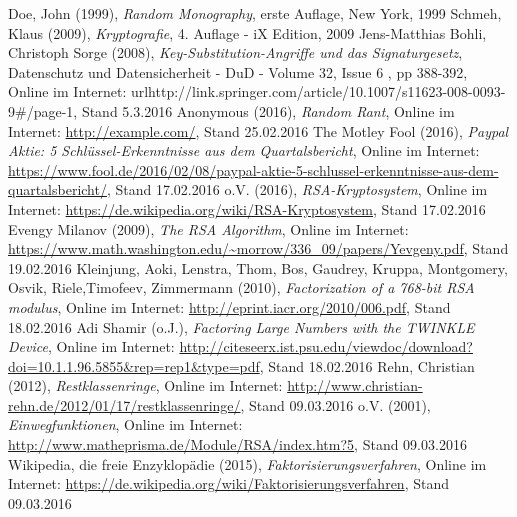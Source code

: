 \documentclass[a4paper, fontsize=12pt, parskip=full, toc=bibliographynumbered]{scrreprt}
\begin{document}
\begin{thebibliography}{9}
 Doe, John (1999), \emph{Random Monography}, erste
  Auflage, New York, 1999
 Schmeh, Klaus (2009), \emph{Kryptografie}, 4. Auflage - iX Edition, 2009
 Jens-Matthias Bohli, Christoph Sorge (2008), \emph{Key-Substitution-Angriffe und das Signaturgesetz}, Datenschutz und Datensicherheit - DuD - Volume 32, Issue 6 , pp 388-392, Online im Internet: url{http://link.springer.com/article/10.1007/s11623-008-0093-9\#/page-1}, Stand 5.3.2016
 Anonymous (2016), \emph{Random Rant}, Online im
  Internet: \url{http://example.com/}, Stand 25.02.2016
 The Motley Fool (2016), \emph{Paypal Aktie: 5 Schlüssel-Erkenntnisse aus dem Quartalsbericht}, Online im
  Internet: \url{https://www.fool.de/2016/02/08/paypal-aktie-5-schlussel-erkenntnisse-aus-dem-quartalsbericht/}, Stand 17.02.2016
 o.V. (2016), \emph{RSA-Kryptosystem}, Online im
  Internet: \url{https://de.wikipedia.org/wiki/RSA-Kryptosystem}, Stand 17.02.2016
 Evengy Milanov (2009), \emph{The RSA Algorithm}, Online im
  Internet: \url{https://www.math.washington.edu/~morrow/336_09/papers/Yevgeny.pdf}, Stand 19.02.2016
 Kleinjung, Aoki, Lenstra, Thom, Bos, Gaudrey, Kruppa, Montgomery, Osvik, Riele,Timofeev, Zimmermann (2010), \emph{Factorization of a 768-bit RSA modulus}, Online im
  Internet: \url{http://eprint.iacr.org/2010/006.pdf}, Stand 18.02.2016
 Adi Shamir (o.J.), \emph{Factoring Large Numbers with the TWINKLE Device}, Online im
  Internet: \url{http://citeseerx.ist.psu.edu/viewdoc/download?doi=10.1.1.96.5855&rep=rep1&type=pdf}, Stand 18.02.2016
 Rehn, Christian (2012), \emph{Restklassenringe}, Online im
  Internet: \url{http://www.christian-rehn.de/2012/01/17/restklassenringe/}, Stand 09.03.2016
 o.V. (2001), \emph{Einwegfunktionen}, Online im Internet: \url{http://www.matheprisma.de/Module/RSA/index.htm?5}, Stand 09.03.2016
 Wikipedia, die freie Enzyklopädie (2015), \emph{Faktorisierungsverfahren}, Online im Internet: \url{https://de.wikipedia.org/wiki/Faktorisierungsverfahren}, Stand 09.03.2016

\end{thebibliography}
\end{document}

